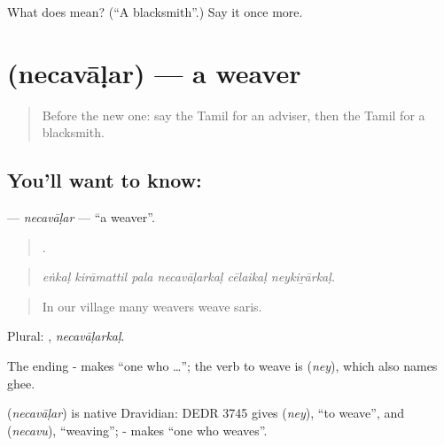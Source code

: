 \begin{tcolorbox}[breakable,colback=teal!4,colframe=teal!35!black,title={Before you move on}]
What does  mean? (\textquotedblleft{}A blacksmith\textquotedblright{}.) Say it once more.
\end{tcolorbox}
\section[\texorpdfstring{\ta{நெசவாளர்} (necavāḷar)}{நெசவாளர் (necavāḷar)}]{ (necavāḷar) — a weaver}

\label{lesson:TA-C513-necavalar}



\begin{quote}
Before the new one: say the Tamil for an adviser, then the Tamil for a blacksmith.
\end{quote}

\subsection*{You'll want to know: }
\textbf{} — \emph{necavāḷar} — \textquotedblleft{}a weaver\textquotedblright{}.

\begin{quote}
     .
\end{quote}

\begin{quote}
\emph{eṅkaḷ kirāmattil pala necavāḷarkaḷ cēlaikaḷ neykiṟārkaḷ.}
\end{quote}

\begin{quote}
In our village many weavers weave saris.
\end{quote}

Plural: , \emph{necavāḷarkaḷ}.

The ending - makes \textquotedblleft{}one who …\textquotedblright{}; the verb to weave is  (\emph{ney}), which also names ghee.

\begin{cousinweb}
\textbf{} (\emph{necavāḷar}) is native Dravidian: DEDR 3745 gives  (\emph{ney}), \textquotedblleft{}to weave\textquotedblright{}, and  (\emph{necavu}), \textquotedblleft{}weaving\textquotedblright{}; - makes \textquotedblleft{}one who weaves\textquotedblright{}.
\end{cousinweb}

